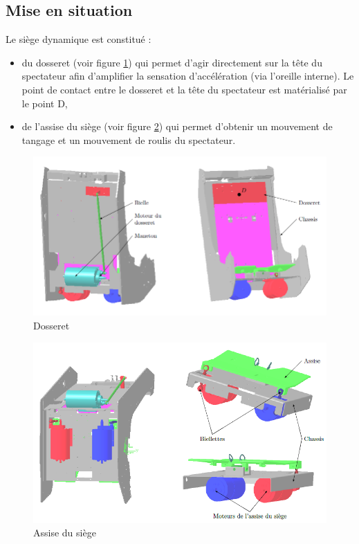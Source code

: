 \subsection{Mise en situation}

Le siège dynamique est constitué :
\begin{itemize}
 \item du dosseret (voir figure \ref{fig2}) qui permet d'agir directement sur la tête du spectateur afin d'amplifier la sensation d'accélération (via l'oreille interne). Le point de contact entre le dosseret et la tête du spectateur est matérialisé par le point D,
 \item de l'assise du siège (voir figure \ref{fig3}) qui permet d'obtenir un mouvement de tangage et un mouvement de roulis du spectateur.
\end{itemize}

\begin{figure}[!ht]
\begin{center}
 \includegraphics[width=0.8\linewidth]{img/img04}
\end{center}
\caption{Dosseret}
\label{fig2}
\end{figure}

\begin{figure}[!ht]
\begin{center}
 \includegraphics[width=0.8\linewidth]{img/img05}
\end{center}
\caption{Assise du siège}
\label{fig3}
\end{figure}

